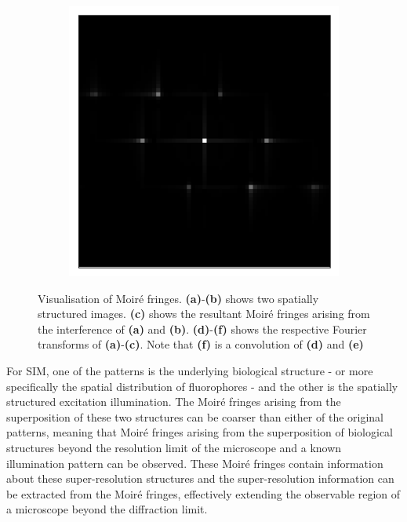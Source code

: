 \begin{figure}[h]
\begin{subfigure}[t]{0.3\textwidth}
		\caption{}
		\label{fig:fringes_2_ft}
	\end{subfigure}
	\begin{subfigure}[t]{0.3\textwidth}
		\centering
		\includegraphics[width=\linewidth]{images/fringes_moire_ft_kx_16_and_12_ky_0_and_12.png}
		\caption{}
		\label{fig:fringes_moire_ft}
	\end{subfigure}
	\caption[Visualisation of Moir\'{e} fringes]{Visualisation of Moir\'{e} 
		fringes. \textbf{(a)}-\textbf{(b)} shows two spatially structured images. 
		\textbf{(c)} shows the resultant Moir\'{e} fringes arising from the 
		interference of \textbf{(a)} and \textbf{(b)}. \textbf{(d)}-\textbf{(f)} 
		shows the respective Fourier transforms of \textbf{(a)}-\textbf{(c)}. 
		Note that \textbf{(f)} is a convolution of \textbf{(d)} and \textbf{(e)}}
	\label{fig:moire_visualisation}
\end{figure}

For SIM, one of the patterns is the underlying biological structure - or more 
specifically the spatial distribution of fluorophores - and the other is the 
spatially structured excitation illumination. The Moir\'{e} fringes arising 
from the superposition of these two structures can be coarser than either of 
the original patterns, meaning that Moir\'{e} fringes arising from the 
superposition of biological structures beyond the resolution limit of the 
microscope and a known illumination pattern can be observed. These Moir\'{e} 
fringes contain information about these super-resolution structures and the
super-resolution information can be extracted from the Moir\'{e} fringes, 
effectively extending the observable region of a microscope beyond the 
diffraction limit\cite{gustafsson2000surpassing}.

